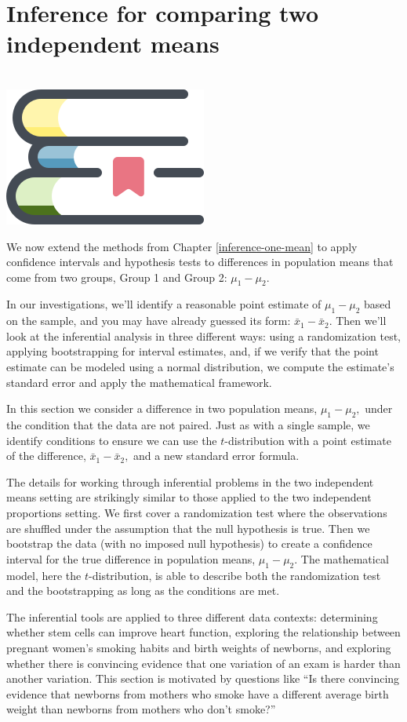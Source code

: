 \documentclass[
  10pt,
  openany]{book}
\newenvironment{mdframedwithfootChapterintro}
{   
    \savenotes
    \begin{mdframed}[%
    topline=true, bottomline=true, linecolor=oiB, linewidth=1.4pt,
    rightline=false, leftline=false,
    backgroundcolor=oiLB]
    \renewcommand{\thempfootnote}{\arabic{footnote}}
    }
{
    \end{mdframed}
    \spewnotes
}
\newenvironment{chapterintro}{
\vspace{4mm}
\begin{mdframedwithfootChapterintro}
\begin{minipage}[t]{0.10\textwidth}
{$\:$ \\ \setkeys{Gin}{width=2.5em,keepaspectratio}\includegraphics{images/_icons/chapterintro.png}}
\end{minipage}
\hfill
\begin{minipage}[t]{0.90\textwidth}
\setlength{\parskip}{1em}
\large
}{\end{minipage}
\end{mdframedwithfootChapterintro}
\vspace{4mm}
}
\begin{document}
\hypertarget{inference-two-means}{%
\chapter{Inference for comparing two independent means}\label{inference-two-means}}

\begin{chapterintro}
We now extend the methods from Chapter \ref{inference-one-mean} to apply confidence intervals and hypothesis tests to differences in population means that come from two groups, Group 1 and Group 2: \(\mu_1 - \mu_2.\)

In our investigations, we'll identify a reasonable point estimate of \(\mu_1 - \mu_2\) based on the sample, and you may have already guessed its form: \(\bar{x}_1 - \bar{x}_2.\)  Then we'll look at the inferential analysis in three different ways: using a randomization test, applying bootstrapping for interval estimates, and, if we verify that the point estimate can be modeled using a normal distribution, we compute the estimate's standard error and apply the mathematical framework.

\end{chapterintro}

In this section we consider a difference in two population means, \(\mu_1 - \mu_2,\) under the condition that the data are not paired.
Just as with a single sample, we identify conditions to ensure we can use the \(t\)-distribution with a point estimate of the difference, \(\bar{x}_1 - \bar{x}_2,\) and a new standard error formula.

The details for working through inferential problems in the two independent means setting are strikingly similar to those applied to the two independent proportions setting.
We first cover a randomization test where the observations are shuffled under the assumption that the null hypothesis is true.
Then we bootstrap the data (with no imposed null hypothesis) to create a confidence interval for the true difference in population means, \(\mu_1 - \mu_2.\) The mathematical model, here the \(t\)-distribution, is able to describe both the randomization test and the bootstrapping as long as the conditions are met.

The inferential tools are applied to three different data contexts: determining whether stem cells can improve heart function, exploring the relationship between pregnant women's smoking habits and birth weights of newborns, and exploring whether there is convincing evidence that one variation of an exam is harder than another variation.
This section is motivated by questions like ``Is there convincing evidence that newborns from mothers who smoke have a different average birth weight than newborns from mothers who don't smoke?''
\end{document}
